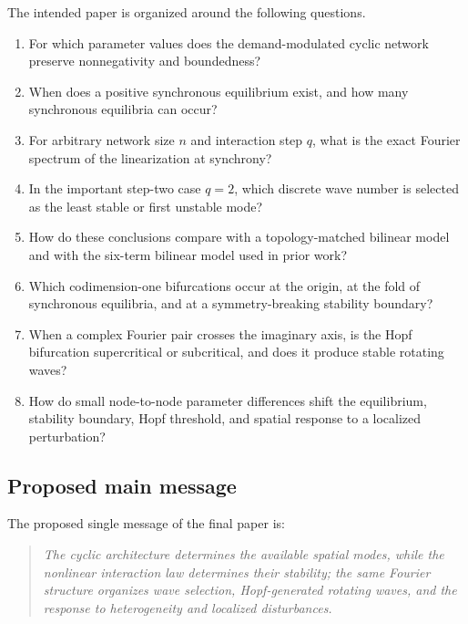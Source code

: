 \documentclass[11pt, reqno]{amsart}
\theoremstyle{definition}
\theoremstyle{remark}
\begin{document}
	The intended paper is organized around the following questions.
	
	\begin{enumerate}[label=\textup{Q\arabic*.},leftmargin=3em]
		\item For which parameter values does the demand-modulated cyclic network
		preserve nonnegativity and boundedness?
		
		\item When does a positive synchronous equilibrium exist, and how many
		synchronous equilibria can occur?
		
		\item For arbitrary network size $n$ and interaction step $q$, what is the
		exact Fourier spectrum of the linearization at synchrony?
		
		\item In the important step-two case $q=2$, which discrete wave number is
		selected as the least stable or first unstable mode?
		
		\item How do these conclusions compare with a topology-matched bilinear
		model and with the six-term bilinear model used in prior work?
		
		\item Which codimension-one bifurcations occur at the origin, at the fold
		of synchronous equilibria, and at a symmetry-breaking stability boundary?
		
		\item When a complex Fourier pair crosses the imaginary axis, is the Hopf
		bifurcation supercritical or subcritical, and does it produce stable
		rotating waves?
		
		\item How do small node-to-node parameter differences shift the
		equilibrium, stability boundary, Hopf threshold, and spatial response to a
		localized perturbation?
	\end{enumerate}
	
	\subsection{Proposed main message}
	
	The proposed single message of the final paper is:
	
	\begin{quote}
		\emph{The cyclic architecture determines the available spatial modes, while
			the nonlinear interaction law determines their stability; the same Fourier
			structure organizes wave selection, Hopf-generated rotating waves, and the
			response to heterogeneity and localized disturbances.}
	\end{quote}
	
\end{document}
